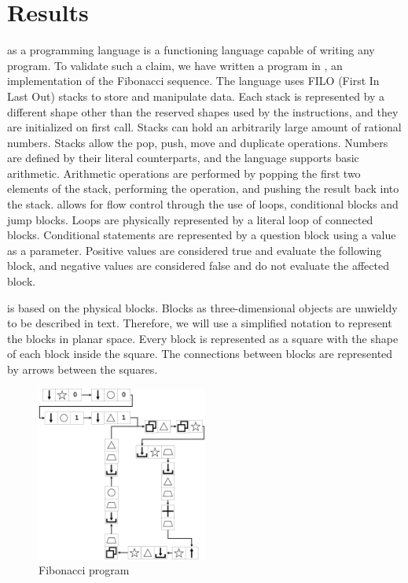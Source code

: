 
\section{Results}
\label{sec:results}

\sculpt as a programming language is a functioning language capable of writing any program.
To validate such a claim, we have written a program in \sculpt, an implementation of the Fibonacci sequence.
The language uses FILO (First In Last Out) stacks to store and manipulate data. Each stack is represented by a different shape other than the reserved shapes used by the instructions, and they are initialized on first call.
Stacks can hold an arbitrarily large amount of rational numbers.
Stacks allow the pop, push, move and duplicate operations.
Numbers are defined by their literal counterparts, and the language supports basic arithmetic.
Arithmetic operations are performed by popping the first two elements of the stack, performing the operation, and pushing the result back into the stack.
\sculpt allows for flow control through the use of loops, conditional blocks and jump blocks.
Loops are physically represented by a literal loop of connected blocks.
Conditional statements are represented by a question block using a value as a parameter. Positive values are considered true and evaluate the following block, and negative values are considered false and do not evaluate the affected block.


\sculpt is based on the physical blocks. Blocks as three-dimensional objects are unwieldy to be described in text.
Therefore, we will use a simplified notation to represent the blocks in planar space.
Every block is represented as a square with the shape of each block inside the square. 
The connections between blocks are represented by arrows between the squares.

\begin{figure}
    \centering
    \includegraphics[width=0.5\textwidth]{figures/ArtlangFibpng}
    \caption{\sculpt Fibonacci program}
    \label{fig:artlangfib}
    \vspace{5pt}
\end{figure}

